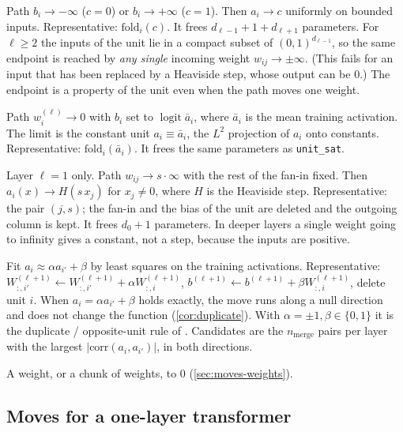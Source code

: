 \documentclass[11pt,a4paper]{article}
\theoremstyle{definition}
\newcommand{\code}[1]{\texttt{#1}}
\begin{document}
\begin{description}[style=nextline, leftmargin=0.6cm, font=\normalfont\ttfamily]
\item[unit\_sat($c$), $c\in\{0,1\}$] Path $b_i\to-\infty$ ($c=0$) or $b_i\to+\infty$
($c=1$). Then $a_i\to c$ uniformly on bounded inputs. Representative:
$\mathrm{fold}_i(c)$. It frees $d_{\ell-1}+1+d_{\ell+1}$ parameters. For $\ell\ge2$ the
inputs of the unit lie in a compact subset of $(0,1)^{d_{\ell-1}}$, so the same
endpoint is reached by \emph{any single} incoming weight
$w_{ij}\to\pm\infty$. (This fails for an input that has been replaced by a Heaviside
step, whose output can be $0$.) The endpoint is a property of the unit even when the path moves
one weight.
\item[unit\_mean] Path $w^{(\ell)}_i\to0$ with $b_i$ set to
$\operatorname{logit}\bar a_i$, where $\bar a_i$ is the mean training activation. The
limit is the constant unit $a_i\equiv\bar a_i$, the $L^2$ projection of $a_i$ onto
constants. Representative: $\mathrm{fold}_i(\bar a_i)$. It frees the same parameters as
\code{unit\_sat}.
\item[unit\_step($j,s$)] Layer $\ell=1$ only. Path $w_{ij}\to s\cdot\infty$ with the
rest of the fan-in fixed. Then $a_i(x)\to H(s\,x_j)$ for $x_j\neq0$, where $H$ is the
Heaviside step. Representative: the pair $(j,s)$; the fan-in and the bias of the unit
are deleted and the outgoing column is kept. It frees $d_0+1$ parameters. In deeper
layers a single weight going to infinity gives a constant, not a step, because the
inputs are positive.
\item[unit\_merge($i\to i'$)] Fit $a_i\approx\alpha a_{i'}+\beta$ by least squares on
the training activations. Representative:
$W^{(\ell+1)}_{:,i'}\leftarrow W^{(\ell+1)}_{:,i'}+\alpha W^{(\ell+1)}_{:,i}$,
$b^{(\ell+1)}\leftarrow b^{(\ell+1)}+\beta W^{(\ell+1)}_{:,i}$, delete unit $i$. When
$a_i=\alpha a_{i'}+\beta$ holds exactly, the move runs along a null direction and does
not change the function (\cref{cor:duplicate}). With $\alpha=\pm1,\beta\in\{0,1\}$ it
is the duplicate / opposite-unit rule of \citet{sietsma1988pruning}. Candidates are
the $n_{\mathrm{merge}}$ pairs per layer with the largest $|\mathrm{corr}(a_i,a_{i'})|$,
in both directions.
\item[zero] A weight, or a chunk of weights, to $0$ (\cref{sec:moves-weights}).
\end{description}

\subsection{Moves for a one-layer transformer}
\label{sec:moves-tf}
\end{document}
